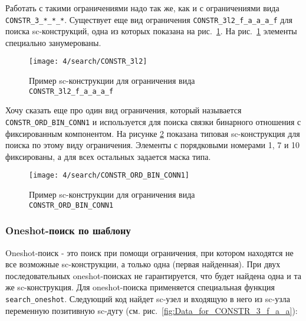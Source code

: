 Работать с такими ограничениями надо так же, как и с ограничениями
вида \verb|CONSTR_3_*_*_*|.  Существует еще вид ограничения
\lstinline|CONSTR_3l2_f_a_a_a_f| для поиска sc-конструкций, одна из
которых показана на рис.~\ref{fig:CONSTR_3l2}. На
рис.~\ref{fig:CONSTR_3l2} элементы специально занумерованы.

\begin{figure}
  \centering
  \texttt{[image: 4/search/CONSTR\_3l2]}
  \caption{ Пример sc-конструкции для ограничения вида
    \lstinline|CONSTR_3l2_f_a_a_a_f|}
  \label{fig:CONSTR_3l2}
\end{figure}

Хочу сказать еще про один вид ограничения, который называется
\lstinline|CONSTR_ORD_BIN_CONN1| и используется для поиска связки
бинарного отношения с фиксированным компонентом. На рисунке
\ref{fig:CONSTR_ORD_BIN_CONN1} показана типовая sc-конструкция для
поиска по этому виду ограничения. Элементы с порядковыми номерами 1, 7
и 10 фиксированы, а для всех остальных задается маска типа.

\begin{figure}
  \centering
  \texttt{[image: 4/search/CONSTR\_ORD\_BIN\_CONN1]}
  \caption{ Пример sc-конструкции для ограничения вида
    \lstinline|CONSTR_ORD_BIN_CONN1|}
  \label{fig:CONSTR_ORD_BIN_CONN1}
\end{figure}

\subsubsection{Oneshot-поиск по шаблону}
\label{sec:libsc_search_oneshot}

Oneshot-поиск - это поиск при помощи ограничения, при котором
находятся не все возможные sc-конструкции, а только одна (первая
найденная). При двух последовательных oneshot-поисках не
гарантируется, что будет найдена одна и та же sc-конструкция. Для
oneshot-поиска применяется специальная функция
\lstinline|search_oneshot|. Следующий код найдет sc-узел  и
входящую в него из sc-узла  переменную позитивную sc-дугу
(см. рис.~\ref{fig:Data_for_CONSTR_3_f_a_a}):

